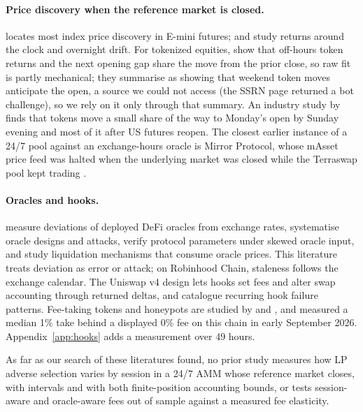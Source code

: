 \documentclass[11pt]{article}
\begin{document}
\paragraph{Price discovery when the reference market is closed.} \citet{hasbrouck2003intraday} locates most index price discovery in E-mini futures; \citet{bondarenko2023clock} and \citet{boyarchenko2023overnight} study returns around the clock and overnight drift. For tokenized equities, \citet{cha2026nest} show that off-hours token returns and the next opening gap share the move from the prior close, so raw fit is partly mechanical; they summarise \citet{cong2025tokenized} as showing that weekend token moves anticipate the open, a source we could not access (the SSRN page returned a bot challenge), so we rely on it only through that summary. An industry study by \citet{agarwal2026bitquery} finds that tokens move a small share of the way to Monday's open by Sunday evening and most of it after US futures reopen. The closest earlier instance of a 24/7 pool against an exchange-hours oracle is Mirror Protocol, whose mAsset price feed was halted when the underlying market was closed while the Terraswap pool kept trading \citep{mirror2021docs}.

\paragraph{Oracles and hooks.} \citet{liu2021oracles} measure deviations of deployed DeFi oracles from exchange rates, \citet{eskandari2021sok} systematise oracle designs and attacks, \citet{deng2024oracle} verify protocol parameters under skewed oracle input, and \citet{qin2021liquidations} study liquidation mechanisms that consume oracle prices. This literature treats deviation as error or attack; on Robinhood Chain, staleness follows the exchange calendar. The Uniswap v4 design \citep{adams2024v4} lets hooks set fees and alter swap accounting through returned deltas, and \citet{donboly2026hooks} catalogue recurring hook failure patterns. Fee-taking tokens and honeypots are studied by \citet{xia2021trade} and \citet{torres2019art}, and \citet{bitquery2026hooks} measured a median 1\% take behind a displayed 0\% fee on this chain in early September 2026. Appendix~\ref{app:hooks} adds a measurement over 49 hours.

As far as our search of these literatures found, no prior study measures how LP adverse selection varies by session in a 24/7 AMM whose reference market closes, with intervals and with both finite-position accounting bounds, or tests session-aware and oracle-aware fees out of sample against a measured fee elasticity.
\end{document}
